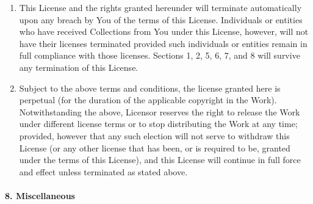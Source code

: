 \begin{enumerate}
  \item This License and the rights granted hereunder will terminate automatically upon any breach by You of the terms of this License. Individuals or entities who have received Collections from You under this License, however, will not have their licenses terminated provided such individuals or entities remain in full compliance with those licenses. Sections 1, 2, 5, 6, 7, and 8 will survive any termination of this License.
  \item Subject to the above terms and conditions, the license granted here is perpetual (for the duration of the applicable copyright in the Work). Notwithstanding the above, Licensor reserves the right to release the Work under different license terms or to stop distributing the Work at any time; provided, however that any such election will not serve to withdraw this License (or any other license that has been, or is required to be, granted under the terms of this License), and this License will continue in full force and effect unless terminated as stated above.
\end{enumerate}

\paragraph{8. Miscellaneous}

